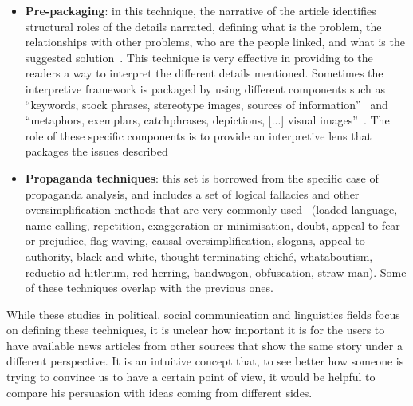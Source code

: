 \begin{itemize}
    
    \item \textbf{Pre-packaging}: in this technique, the narrative of the article identifies structural roles of the details narrated, defining what is the problem, the relationships with other problems, who are the people linked, and what is the suggested solution~\cite{entman1993framing,bell1991language}.
    This technique is very effective in providing to the readers a way to interpret the different details mentioned.
    Sometimes the interpretive framework is packaged by using different components such as ``keywords, stock phrases, stereotype images, sources of information''~\cite{entman1993framing} and ``metaphors, exemplars, catchphrases, depictions, [...] visual images''~\cite{gamson1989media}.
    The role of these specific components is to provide an interpretive lens that packages the issues described
    
    \item \textbf{Propaganda techniques}: this set is borrowed from the specific case of propaganda analysis, and includes a set of logical fallacies and other oversimplification methods that are very commonly used~\cite{da2019fine} (loaded language, name calling, repetition, exaggeration or minimisation, doubt, appeal to fear or prejudice, flag-waving, causal oversimplification, slogans, appeal to authority, black-and-white, thought-terminating chiché, whataboutism, reductio ad hitlerum, red herring, bandwagon, obfuscation, straw man).
    Some of these techniques overlap with the previous ones.
\end{itemize}



While these studies in political, social communication and linguistics fields focus on defining these techniques, it is unclear how important it is for the users to have available news articles from other sources that show the same story under a different perspective.
It is an intuitive concept that, to see better how someone is trying to convince us to have a certain point of view, it would be helpful to compare his persuasion with ideas coming from different sides.

